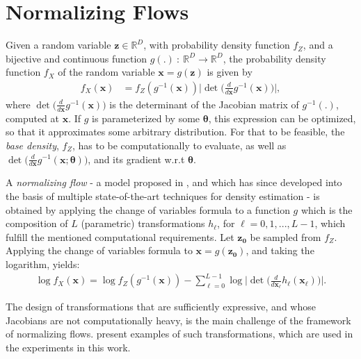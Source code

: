 \section{Normalizing Flows}
\label{cov}
Given a random variable $\bm{z} \in \mathbb{R}^D$, with probability density function $f_Z$,
and a bijective and continuous function $g(.)\: : \: \mathbb{R}^D\rightarrow \mathbb{R}^D$,
the probability density function $f_X$ of the random variable $\bm{x} = g(\bm{z})$ is given by
\begin{align}
    f_X(\bm{x}) &= f_Z(g^{-1}(\bm{x}))\Big|\det\Big(\frac{d}{d\bm{x}}g^{-1}(\bm{x})\Big)\Big|,
\end{align} where $\det\Big(\frac{d}{d\bm{x}}g^{-1}(\bm{x})\Big)$
is the determinant of the Jacobian matrix of $g^{-1}(.)$, computed at $\bm{x}$.
If $g$ is parameterized by some $\bm\theta$,
this expression can be optimized, so that it approximates some arbitrary distribution.
For that to be feasible, the \emph{base density}, $f_Z$, has to be computationally  to evaluate,
as well as $\det\Big(\frac{d}{d\bm{x}}g^{-1}(\bm{x};\bm\theta)\Big)$, and its gradient w.r.t
$\bm\theta$.

A \emph{normalizing flow} - a model proposed in \autocite{shakir_nf}, and which
has since developed into the basis of multiple state-of-the-art techniques for
density estimation \autocites{Glow}{real-nvp}{bnaf19}{maf} - is obtained by
applying the change of variables formula to a function $g$ which is the composition
of $L$ (parametric) transformations $h_\ell$, for ${\ell = 0, 1, ..., L-1}$, which
fulfill the mentioned computational requirements.
Let $\bm{z_0}$ be sampled from $f_Z$. Applying the change of variables formula
to $\bm{x} = g(\bm{z_0})$, and taking the logarithm, yields:
\begin{align}
    \log f_X(\bm{x}) = \log f_Z(g^{-1}(\bm{x})) - \sum_{\ell=0}^{L-1} \log \Big|\det\Big(\frac{d}{d\bm{x_{\ell}}}h_{\ell}(\bm{x_\ell})\Big) \Big|. \label{eq:nflowsfinal}
\end{align}

The design of transformations that are sufficiently expressive, and whose Jacobians
are not computationally heavy, is the main challenge of the framework of normalizing
flows. \textcites{real-nvp}{maf} present examples of such transformations, which
are used in the experiments in this work.

